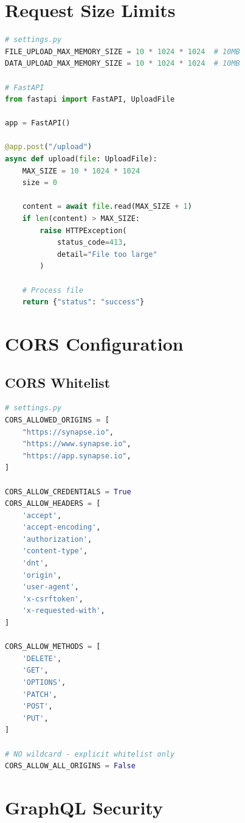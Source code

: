 \documentclass{report}
\begin{document}
\section{Request Size Limits}

\begin{lstlisting}[language=Python]
# settings.py
FILE_UPLOAD_MAX_MEMORY_SIZE = 10 * 1024 * 1024  # 10MB
DATA_UPLOAD_MAX_MEMORY_SIZE = 10 * 1024 * 1024  # 10MB

# FastAPI
from fastapi import FastAPI, UploadFile

app = FastAPI()

@app.post("/upload")
async def upload(file: UploadFile):
    MAX_SIZE = 10 * 1024 * 1024
    size = 0
    
    content = await file.read(MAX_SIZE + 1)
    if len(content) > MAX_SIZE:
        raise HTTPException(
            status_code=413,
            detail="File too large"
        )
    
    # Process file
    return {"status": "success"}
\end{lstlisting}

\section{CORS Configuration}

\subsection{CORS Whitelist}
\begin{lstlisting}[language=Python]
# settings.py
CORS_ALLOWED_ORIGINS = [
    "https://synapse.io",
    "https://www.synapse.io",
    "https://app.synapse.io",
]

CORS_ALLOW_CREDENTIALS = True
CORS_ALLOW_HEADERS = [
    'accept',
    'accept-encoding',
    'authorization',
    'content-type',
    'dnt',
    'origin',
    'user-agent',
    'x-csrftoken',
    'x-requested-with',
]

CORS_ALLOW_METHODS = [
    'DELETE',
    'GET',
    'OPTIONS',
    'PATCH',
    'POST',
    'PUT',
]

# NO wildcard - explicit whitelist only
CORS_ALLOW_ALL_ORIGINS = False
\end{lstlisting}

\section{GraphQL Security}
\end{document}
